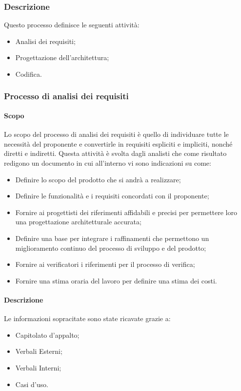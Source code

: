 \subsubsection{Descrizione}
Questo processo definisce le seguenti attività:
\begin{itemize}
  \item Analisi dei requisiti;
  \item Progettazione dell'architettura;
  \item Codifica.
\end{itemize}
\subsubsection{Processo di analisi dei requisiti}
\label{_processoAnalisiDeiRequisiti}
\paragraph{Scopo}
Lo scopo del processo di analisi dei requisiti è quello di individuare tutte le necessità del proponente e convertirle in requisiti espliciti e impliciti, nonché diretti e indiretti. Questa attività è svolta dagli analisti che come risultato redigono un documento in cui all'interno vi sono indicazioni su come:
\begin{itemize}
  \item Definire lo scopo del prodotto che si andrà a realizzare;
  \item Definire le funzionalità e i requisiti concordati con il proponente;
  \item Fornire ai progettisti dei riferimenti affidabili e precisi per permettere loro una progettazione architetturale accurata;
  \item Definire una base per integrare i raffinamenti che permettono un miglioramento continuo del processo di sviluppo e del prodotto;
  \item Fornire ai verificatori i riferimenti per il processo di verifica;
  \item Fornire una stima oraria del lavoro per definire una stima dei costi.
\end{itemize}

\paragraph{Descrizione}
Le informazioni sopracitate sono state ricavate grazie a:
\begin{itemize}
  \item Capitolato d'appalto;
  \item Verbali Esterni;
  \item Verbali Interni;
  \item Casi d'uso.
\end{itemize}

